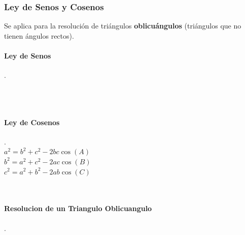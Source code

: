 \documentclass[stu, 12pt, a4paper, donotrepeattitle, floatsintext, natbib]{apa7}
\begin{document}
    \subsubsection{Ley de Senos y Cosenos}
    Se aplica para la resolución de triángulos \textbf{oblicuángulos} (triángulos que no tienen ángulos rectos).\\[0.5cm]

    \begin{paracol}{2}
        \paragraph{Ley de Senos}.\\[0.5cm]
        \\[0.5cm]
        \\[0.5cm]
        \switchcolumn

        \paragraph{Ley de Cosenos}.\\[0.5cm]
        $a^2=b^2+c^2-2bc\cos(A)$\\
        $b^2=a^2+c^2-2ac\cos(B)$\\
        $c^2=a^2+b^2-2ab\cos(C)$\\

    \end{paracol}\\[1cm]

    \paragraph{Resolucion de un Triangulo Oblicuangulo}.\\[0.5cm]
\end{document}
